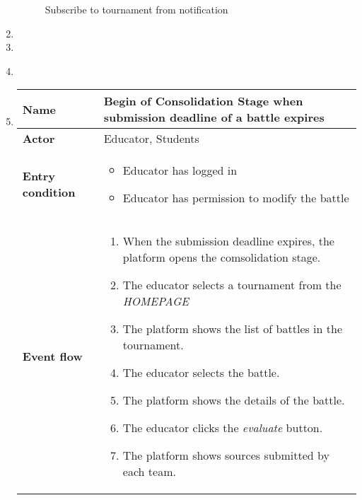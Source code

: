 \begin{enumerate}[label=\textbf{UC\arabic*}:,leftmargin=1.3cm]
          \begin{figure}[H]
              \centering
              \caption{Subscribe to tournament from notification}
              \label{fig:Subscribe to tournament from notification}
          \end{figure}
          \pagebreak
    \item
    \item
    \item \textbf{}
          \pagebreak
    \item \textbf{}
          \begin{table}[H]
              \centering
              \begin{tabular}{|l|p{11.9cm}|}
                  \hline
                  \textbf{Name}            & Begin of Consolidation Stage when submission deadline of a battle expires   \\\hline
                  \textbf{Actor}           & Educator, Students                                                          \\\hline
                  \textbf{Entry condition} &
                  \begin{itemize}
                      \item Educator has logged in
                      \item Educator has permission to modify the battle
                  \end{itemize}                                                      \\\hline
                  \textbf{Event flow}      &
                  \begin{enumerate}[label=\arabic*.]
                      \item When the submission deadline expires, the platform opens the comsolidation stage.
                      \item The educator selects a tournament from the \emph{HOMEPAGE}
                      \item The platform shows the list of battles in the tournament.
                      \item The educator selects the battle.
                      \item The platform shows the details of the battle.
                      \item The educator clicks the \emph{evaluate} button.
                      \item The platform shows sources submitted by each team.

\end{enumerate}
\end{tabular}
\end{table}
\end{enumerate}
